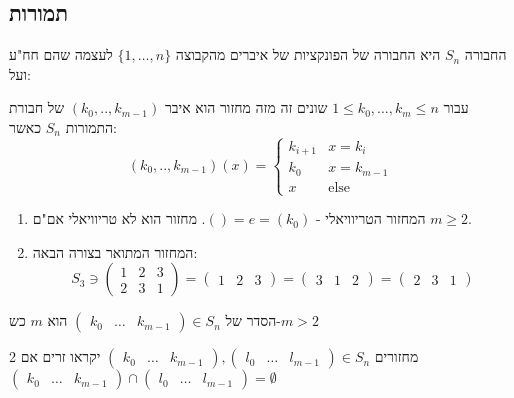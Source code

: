 \documentclass{tstextbook}
\begin{document}
\subsection{תמורות}

\begin{reminder}
החבורה \(S_{n}\) היא החבורה של הפונקציות של איברים מהקבוצה \(\{ 1,\dots,n \}\) לעצמה שהם חח"ע ועל:

\end{reminder}
\begin{definition}[מחזור]
עבור \(1\leq k_{0},\dots,k_{m}\leq n\) שונים זה מזה
 מחזור הוא איבר \((k_{0},..,k_{m-1})\) של חבורת התמורות \(S_{n}\) כאשר:
 $$(k_{0},..,k_{m-1})(x)=\begin{cases}k_{i+1} & x=k_{i} \\k_{0}  & x=k_{m-1} \\x & \text{else}
\end{cases}$$

\end{definition}
\begin{example}
  \begin{enumerate}
    \item המחזור הטריוויאלי - \(()=e=(k_{0})\). מחזור הוא לא טריוויאלי אם"ם \(m\geq 2\). 


    \item המחזור המתואר בצורה הבאה: 
$$S_{3}\ni\begin{pmatrix}1  & 2 & 3 \\2 & 3 & 1\end{pmatrix} = \begin{pmatrix}1 & 2 & 3\end{pmatrix}=\begin{pmatrix}3 & 1 & 2\end{pmatrix}=\begin{pmatrix}2 & 3 & 1
\end{pmatrix}$$


  \end{enumerate}
\end{example}
\begin{remark}
הסדר של \(\begin{pmatrix} k_{0}& \dots & k_{m-1}\end{pmatrix}\in S_{n}\)  הוא \(m\) כש-\(m>2\)

\end{remark}
\begin{definition}
2 מחזורים \(\begin{pmatrix} k_{0}& \dots & k_{m-1}\end{pmatrix},\begin{pmatrix} l_{0}& \dots & l_{m-1}\end{pmatrix}\in S_{n}\) יקראו זרים אם \(\begin{pmatrix} k_{0}& \dots & k_{m-1}\end{pmatrix}\cap\begin{pmatrix} l_{0}& \dots & l_{m-1}\end{pmatrix}=\emptyset\)

\end{definition}
\end{document}
